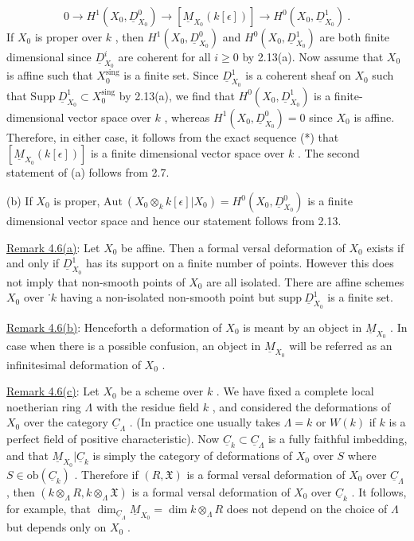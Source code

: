 \begin{equation}\tag{*}
0 \to H^{1}(X_{0}, \underline{D}^{0}_{X_{0}}) \to [\underline{M}_{X_{0}}(k[\epsilon])] \to H^{0}(X_{0}, \underline{D}^{1}_{X_{0}}) \ .
\end{equation}
If  $X_{0}$  is proper over  $k$  , then  $H^{1}(X_{0}, \underline{D}^{0}_{X_{0}})$  and  $H^{0}(X_{0}, \underline{D}^{1}_{X_{0}})$  are both finite dimensional since  $\underline{D}^{i}_{X_{0}}$  are coherent for all  $i \geq 0$  by 2.13(a). Now assume that $X_{0}$  is affine such that  $X_{0}^{\mathrm{sing}}$  is a finite set. Since  $\underline{D}^{1}_{X_{0}}$  is a coherent sheaf on  $X_{0}$  such that  $\mathrm{Supp}\ \underline{D}^{1}_{X_{0}} \subset X_{0}^{\mathrm{sing}}$  by 2.13(a), we find that  $H^{0}(X_{0}, \underline{D}^{1}_{X_{0}})$  is a finite-dimensional vector space over  $k$  , whereas  $H^{1}(X_{0}, \underline{D}^{0}_{X_{0}}) = 0$  since  $X_{0}$ is affine. Therefore, in either case, it follows from the exact sequence (*) that $[\underline{M}_{X_{0}}(k[\epsilon])]$  is a finite dimensional vector space over  $k$  . The second statement of (a) follows from 2.7.

          (b)  If  $X_{0}$  is proper,  $\mathrm{Aut}\ (X_{0} \otimes_{k} k[\epsilon]|X_{0}) = H^{0}(X_{0}, \underline{D}^{0}_{X_{0}})$  is a finite dimensional vector space and hence our statement follows from 2.13.

\underline{Remark 4.6(a)}:  Let  $X_{0}$  be affine. Then a formal versal deformation of  $X_{0}$ exists if and only if  $\underline{D}^{1}_{X_{0}}$  has its support on a finite number of points. However this does not imply that non-smooth points of  $X_{0}$  are all isolated. There are affine schemes  $X_{0}$  over ˙$k$  having a non-isolated non-smooth point but  $\mathrm{supp}\ \underline{D}^{1}_{X_{0}}$ is a finite set.

\underline{Remark 4.6(b)}:  Henceforth a deformation of  $X_{0}$  is meant by an object in  $\underline{M}_{X_{0}}$  . In case when there is a possible confusion, an object in  $\underline{M}_{X_{0}}$  will be referred as an infinitesimal deformation of  $X_{0}$  .

\underline{Remark 4.6(c)}:  Let  $X_{0}$  be a scheme over  $k$  . We have fixed a complete local noetherian ring  $\Lambda$  with the residue field  $k$  , and considered the deformations
of  $X_{0}$  over the category  $\underline{C}_{\Lambda}$  . (In practice one usually takes  $\Lambda = k$  or  $W(k)$ if  $k$  is a perfect field of positive characteristic). Now  $\underline{C}_{k} \subset \underline{C}_{\Lambda}$  is a fully faithful imbedding, and that  $\underline{M}_{X_{0}}|\underline{C}_{k}$  is simply the category of deformations of $X_{0}$  over  $S$  where  $S \in \mathrm{ob}(\underline{C}_{k})$  . Therefore if  $(R, \mathfrak{X})$  is a formal versal deformation of  $X_{0}$  over  $\underline{C}_{\Lambda}$  , then  $(k \otimes_{\Lambda} R, k \otimes_{\Lambda} \mathfrak{X})$  is a formal versal deformation of $X_{0}$  over  $\underline{C}_{k}$  . It follows, for example, that  $\dim_{\underline{C}_{\Lambda}} \underline{M}_{X_{0}} = \dim k \otimes_{\Lambda} R$  does not depend on the choice of  $\Lambda$  but depends only on  $X_{0}$  .

